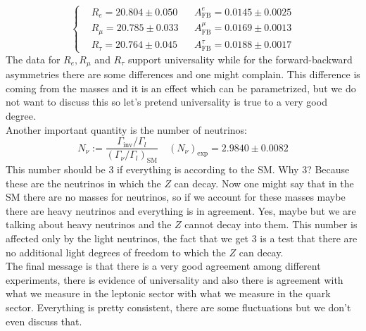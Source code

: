 \documentclass[../main.tex]{subfiles}
\begin{document}
\[
\left\{
\begin{aligned}
&R_e=20.804\pm0.050 &&A_{\text{FB}}^e=0.0145\pm0.0025\\
&R_\mu=20.785\pm0.033 &&A_{\text{FB}}^\mu=0.0169\pm0.0013\\
&R_\tau=20.764\pm0.045 &&A_{\text{FB}}^\tau=0.0188\pm0.0017
\end{aligned}
\right.
\]
The data for $R_e, R_\mu$ and $R_\tau$ support universality while for the forward-backward asymmetries there are some differences and one might complain. This difference is coming from the masses and it is an effect which can be parametrized, but we do not want to discuss this so let's pretend universality is true to a very good degree.\\
Another important quantity is the number of neutrinos:
\[
N_\nu:=\frac{\Gamma_{\text{inv}}/\Gamma_l}{(\Gamma_\nu/\Gamma_l)_{\text{SM}}} \quad (N_\nu)_{\text{exp}}=2.9840\pm0.0082
\]
This number should be 3 if everything is according to the SM. Why 3? Because these are the neutrinos in which the $Z$ can decay. Now one might say that in the SM there are no masses for neutrinos, so if we account for these masses maybe there are heavy neutrinos and everything is in agreement. Yes, maybe but we are talking about heavy neutrinos and the $Z$ cannot decay into them. This number is affected only by the light neutrinos, the fact that we get 3 is a test that there are no additional light degrees of freedom to which the $Z$ can decay.\\
The final message is that there is a very good agreement among different experiments, there is evidence of universality and also there is agreement with what we measure in the leptonic sector with what we measure in the quark sector. Everything is pretty consistent, there are some fluctuations but we don't even discuss that. \\ 
\end{document}
